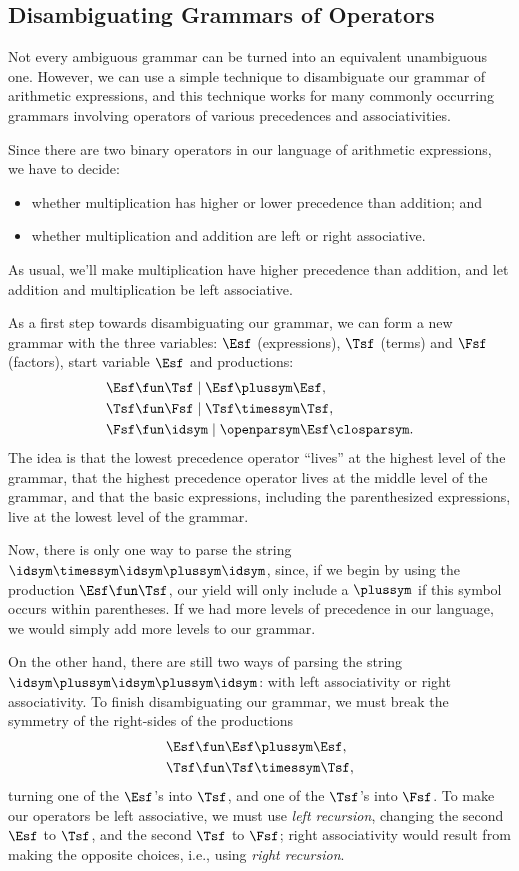 \subsection{Disambiguating Grammars of Operators}

Not every ambiguous grammar can be turned into an equivalent
unambiguous one.  However, we can use a simple technique to
disambiguate our grammar of arithmetic expressions, and this technique
works for many commonly occurring grammars involving operators of
various precedences and associativities.

Since there are two binary operators in our language of arithmetic
expressions, we have to decide:
\begin{itemize}
\item whether multiplication has higher or lower precedence than
  addition; and

\item whether multiplication and addition are left or right
  associative.
\end{itemize}
As usual, we'll make multiplication have higher precedence than
addition, and let addition and multiplication be left associative.

As a first step towards disambiguating our grammar, we can form
a new grammar with the three variables: $\Esf$ (expressions),
$\Tsf$ (terms) and $\Fsf$ (factors), start variable $\Esf$
and productions:
\begin{align*}
  \Esf &\fun \Tsf\mid \Esf\plussym\Esf , \\
  \Tsf &\fun \Fsf\mid \Tsf\timessym\Tsf , \\
  \Fsf &\fun \idsym \mid \openparsym\Esf\closparsym .
\end{align*}
The idea is that the lowest precedence operator ``lives'' at the
highest level of the grammar, that the highest precedence operator
lives at the middle level of the grammar, and that the basic
expressions, including the parenthesized expressions, live at
the lowest level of the grammar.

Now, there is only one way to parse the string
$\idsym\timessym\idsym\plussym\idsym$, since, if we begin
by using the production $\Esf\fun\Tsf$, our yield will only
include a $\plussym$ if this symbol occurs within parentheses.
If we had more levels of precedence in our language, we would simply
add more levels to our grammar.

On the other hand, there are still two ways of parsing the string
$\idsym\plussym\idsym\plussym\idsym$: with left associativity or right
associativity.  To finish disambiguating our grammar, we must break
the symmetry of the right-sides of the productions
\begin{align*}
  \Esf &\fun \Esf\plussym\Esf , \\
  \Tsf &\fun \Tsf\timessym\Tsf ,
\end{align*}
turning one of the $\Esf$'s into $\Tsf$, and one of the $\Tsf$'s into
$\Fsf$.  To make our operators be left associative, we must use
\emph{left recursion}, changing the second $\Esf$ to $\Tsf$, and the
second $\Tsf$ to $\Fsf$; right associativity would result from making
the opposite choices, i.e., using \emph{right recursion}.

